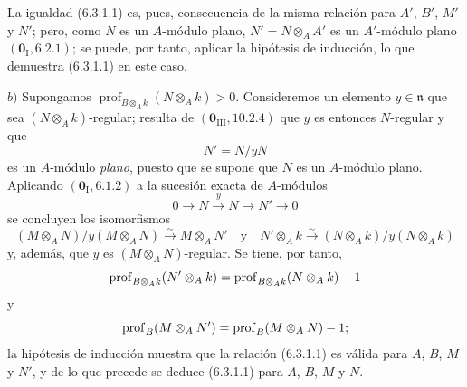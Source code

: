 La igualdad (6.3.1.1) es, pues, consecuencia de la misma relación para $A'$,
$B'$, $M'$ y $N'$; pero, como $N$ es un $A$-módulo plano,
$N'=N\otimes_AA'$ es un $A'$-módulo plano $(\mathbf{0}_{\mathrm I}, 6.2.1)$; se puede,
por tanto, aplicar la hipótesis de inducción, lo que demuestra (6.3.1.1) en
este caso.

$b)$ Supongamos $\operatorname{prof}_{B\otimes_Ak}(N\otimes_Ak)>0$.
Consideremos un elemento $y\in\mathfrak n$ que sea
$(N\otimes_Ak)$-regular; resulta de $(\mathbf{0}_{\mathrm{III}}, 10.2.4)$ que $y$ es
entonces $N$-regular y que
\[
N'=N/yN
\]
es un $A$-módulo \emph{plano}, puesto que se supone que $N$ es un $A$-módulo plano.
Aplicando $(\mathbf{0}_{\mathrm I}, 6.1.2)$ a la sucesión exacta de $A$-módulos
\[
0\to N\xrightarrow{y}N\to N'\to0
\]
se concluyen los isomorfismos
\[
(M\otimes_AN)/y(M\otimes_AN)\xrightarrow{\sim}M\otimes_AN'
\quad\text{y}\quad
N'\otimes_Ak\xrightarrow{\sim}(N\otimes_Ak)/y(N\otimes_Ak)
\]
y, además, que $y$ es $(M\otimes_AN)$-regular. Se tiene, por tanto,
\[
\operatorname{prof}_{B\otimes_Ak}(N'\otimes_Ak)
=\operatorname{prof}_{B\otimes_Ak}(N\otimes_Ak)- 1
\]
y
\[
\operatorname{prof}_B(M\otimes_AN')
=\operatorname{prof}_B(M\otimes_AN)- 1;
\]
la hipótesis de inducción muestra que la relación (6.3.1.1) es válida para
$A$, $B$, $M$ y $N'$, y de lo que precede se deduce (6.3.1.1) para $A$, $B$,
$M$ y $N$.
